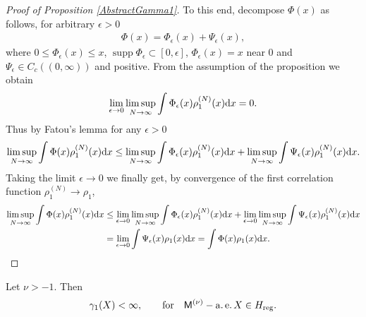 \begin{proof}[Proof of Proposition \ref{AbstractGamma1}]
To this end, decompose $\Phi(x)$ as follows, for arbitrary $\epsilon>0$
\begin{gather*}
\Phi(x)=\Phi_{\epsilon}(x)+\Psi_{\epsilon}(x),
\end{gather*}
where $0\le \Phi_{\epsilon}(x)\le x$, $\operatorname{supp} \Phi_{\epsilon} \subset [0,\epsilon]$, $\Phi_{\epsilon}(x)=x$ near $0$ and $\Psi_{\epsilon}\in C_{c} ((0,\infty) )$ and positive. From the assumption of the proposition we obtain
\begin{gather*}
\lim_{\epsilon \to 0} \limsup_{N \to \infty}\int\Phi_{\epsilon}(x)\rho_1^{(N)}(x){\rm d}x=0.
\end{gather*}
Thus by Fatou's lemma for any $\epsilon>0$
\begin{gather*}
\limsup_{N \to \infty}\int\Phi(x)\rho_1^{(N)}(x){\rm d}x\le \limsup_{N \to \infty}\int\Phi_{\epsilon}(x)\rho_1^{(N)}(x){\rm d}x+\limsup_{N \to \infty}\int\Psi_{\epsilon}(x)\rho_1^{(N)}(x){\rm d}x.
\end{gather*}
Taking the limit $\epsilon \to 0$ we finally get, by convergence of the first correlation function $\rho_1^{(N)} \to \rho_1$,
\begin{align*}
\limsup_{N \to \infty}\int\Phi(x)\rho_1^{(N)}(x){\rm d}x&\le \lim_{\epsilon \to 0}\limsup_{N \to \infty}\int\Phi_{\epsilon}(x)\rho_1^{(N)}(x){\rm d}x+ \lim_{\epsilon \to 0}\limsup_{N \to \infty}\int\Psi_{\epsilon}(x)\rho_1^{(N)}(x){\rm d}x\\
&=\lim_{\epsilon \to 0}\int\Psi_{\epsilon}(x)\rho_1(x){\rm d}x=\int \Phi(x)\rho_1(x){\rm d}x.\tag*{\qed}
\end{align*}\renewcommand{\qed}{}
\end{proof}

\begin{Proposition}\label{FinitenessGamma1}Let $\nu>-1$. Then
\begin{gather*}
\gamma_1(X)<\infty, \qquad \text{for} \quad \mathsf{M}^{(\nu)}-\operatorname{a.e.} X \in H_{{\rm reg}}.
\end{gather*}
\end{Proposition}

